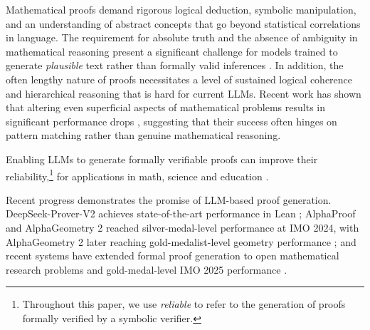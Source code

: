 Mathematical 
proofs demand rigorous logical deduction, symbolic manipulation, and an understanding 
of abstract concepts that go beyond statistical correlations in language. The requirement for absolute 
truth and the absence of ambiguity in mathematical reasoning present a significant challenge for models trained to generate \emph{plausible} text rather than formally valid inferences \cite{singh2024exposing, pan2025lemma}. 
In addition, the often lengthy nature of proofs necessitates a level of sustained logical coherence and hierarchical reasoning 
that is hard for current LLMs. Recent work has shown that altering even superficial aspects of mathematical problems results in significant performance drops \cite{mirzadeh2024gsm}, suggesting that their success often hinges on pattern matching rather than genuine mathematical reasoning.











Enabling LLMs to generate formally verifiable proofs can improve their reliability,\footnote{Throughout this paper, we use \emph{reliable} to refer to the generation of proofs formally verified by a symbolic verifier.} for applications in math, science and education \cite{welleck2022naturalprover, gupta2025beyond, kumar2023math}.


Recent progress demonstrates the promise of LLM-based proof generation. DeepSeek-Prover-V2 achieves state-of-the-art performance in Lean \cite{ren2025deepseek}; AlphaProof and AlphaGeometry 2 reached silver-medal-level performance at IMO 2024, with AlphaGeometry 2 later reaching gold-medalist-level geometry performance \cite{hubert2026olympiad, chervonyi2025gold}; and recent systems have extended formal proof generation to open mathematical research problems and gold-medal-level IMO 2025 performance \cite{tsoukalas2026advancing, achim2025aristotle}.


